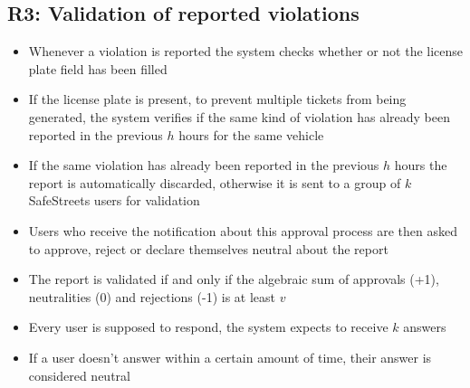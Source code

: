 \subsection{R3: Validation of reported violations}
\begin{itemize}
    \item Whenever a violation is reported the system checks whether or not the license plate field has been filled
    \item If the license plate is present, to prevent multiple tickets from being generated, the system verifies if the same kind of violation has already been reported in the previous $h$ hours for the same vehicle
    \item If the same violation has already been reported in the previous $h$ hours the report is automatically discarded, otherwise it is sent to a group of $k$ SafeStreets users for validation
    \item Users who receive the notification about this approval process are then asked to approve, reject or declare themselves neutral about the report
    \item The report is validated if and only if the algebraic sum of approvals (+1), neutralities (0) and rejections (-1) is at least $v$
    \item Every user is supposed to respond, the system expects to receive $k$ answers
    \item If a user doesn't answer within a certain amount of time, their answer is considered neutral
\end{itemize}

